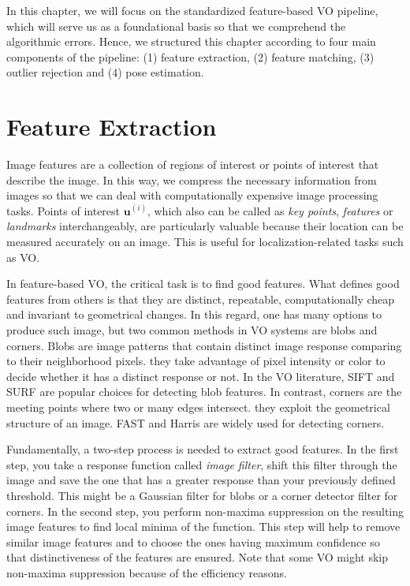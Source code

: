 \documentclass[12pt]{report}
\numberwithin{figure}{section}
\begin{document}
In this chapter, we will focus on the standardized feature-based VO pipeline, 
which will serve us as a foundational basis so that we comprehend the 
algorithmic errors. Hence, we structured this chapter according to four main 
components of the pipeline: (1) feature extraction, (2) feature matching, (3) 
outlier rejection and (4) pose estimation. 


\section{Feature Extraction} \label{sc_feature_extraction}

Image features are a collection of regions of interest or points of interest 
that describe the image. In this way, we compress the necessary information 
from images so that we can deal with computationally expensive image 
processing tasks. Points of interest $\mathbf{u}^{(i)}$, which also can be 
called as 
\textit{key points}, \textit{features} or \textit{landmarks} interchangeably, 
are particularly valuable because their location can be measured 
accurately on an image. This is useful for localization-related tasks such as 
VO. 

In feature-based VO, the critical task is to find good features.  What defines 
good features from others is that they are distinct, repeatable, 
computationally cheap and invariant to geometrical changes. In this regard, 
one has many 
options to produce such image, but two common methods in VO systems are blobs 
and corners. Blobs are image patterns that contain distinct image response 
comparing to their neighborhood pixels. they take advantage of pixel 
intensity or color to decide whether it has a distinct response or not.  In 
the VO literature, SIFT \parencite{Lowe2004} and SURF \parencite{Bay2008} are 
popular 
choices for detecting blob features.  In contrast, corners are the meeting 
points where two or many edges intersect.  they exploit the 
geometrical structure of an image.  FAST \parencite{Rosten2006} and Harris 
\parencite{Harris1988} are widely used for detecting corners.

Fundamentally, a two-step process is needed to extract good features.  In the 
first step, 
you take a response function called \textit{image filter}, shift this filter 
through the image and save the one that has a greater response than your 
previously defined threshold.  This might be a Gaussian filter for blobs or a 
corner detector filter for corners. In the second step, you perform non-maxima 
suppression on the resulting image features to find local minima of the 
function.  This step will help to remove similar image features and to choose 
the ones having maximum confidence so that distinctiveness of the features are 
ensured.  Note that some VO might skip non-maxima suppression because of the 
efficiency 
reasons.
\end{document}
